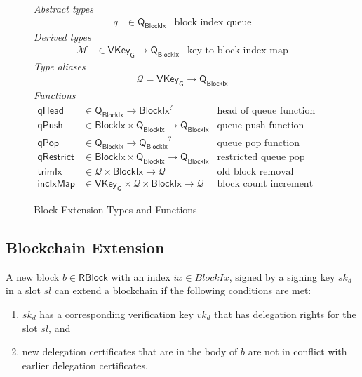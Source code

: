 \documentclass[11pt,a4paper]{article}
\newcommand{\fun}[1]{\mathsf{#1}}
\newcommand{\type}[1]{\mathsf{#1}}
\newcommand{\BlockIx}{\type{BlockIx}}
\newcommand{\RBlock}{\type{RBlock}}
\newcommand{\Queue}{\type{Q}}
\newcommand{\VKeyGen}{\type{VKey_G}}
\newcommand{\signmapname}{\mathcal{M}}
\newcommand{\trimixname}{trimIx}
\newcommand{\incixmapname}{incIxMap}
\newcommand{\qrestrname}{qRestrict}
\newcommand{\qpopname}{qPop}
\newcommand{\totalf}{\to}
\newcommand{\mapqueue}{\mathcal{Q}}
\begin{document}
\begin{figure}
  \emph{Abstract types}
  \begin{align*}
    q & \in \Queue_\BlockIx  & \text{block index queue}
  \end{align*}
  \emph{Derived types}
  \begin{align*}
    \signmapname & \in \VKeyGen \totalf \Queue_\BlockIx & \text{key to block index map}
  \end{align*}
  \emph{Type aliases}
  \begin{align*}
    \mapqueue = \VKeyGen \totalf \Queue_\BlockIx
  \end{align*}
  \emph{Functions}
  \begin{align*}
    \fun{qHead} & \in \Queue_\BlockIx \totalf \BlockIx^? & \text{head of queue function} \\
    \fun{qPush} & \in \BlockIx \times \Queue_\BlockIx \totalf \Queue_\BlockIx
      & \text{queue push function} \\
    \fun{\qpopname} & \in \Queue_\BlockIx \totalf {\Queue_\BlockIx}^?
      & \text{queue pop function} \\
    \fun{\qrestrname} & \in \BlockIx \times \Queue_\BlockIx \totalf \Queue_\BlockIx
      & \text{restricted queue pop function} \\
    \fun{\trimixname} & \in \mapqueue \times \BlockIx \totalf \mapqueue
      & \text{old block removal function} \\
    \fun{\incixmapname} & \in \VKeyGen \times \mapqueue \times \BlockIx \totalf \mapqueue
      & \text{block count increment function}
  \end{align*}
  \caption{Block Extension Types and Functions}
  \label{fig:block-ext-types-funs}
\end{figure}


\subsection{Blockchain Extension}
\label{sec:chain-extension}

A new block $b \in \RBlock$ with an index $ix \in BlockIx$, signed by a
signing key $sk_d$ in a slot $sl$ can extend a blockchain if the following
conditions are met:
%
\begin{enumerate}
\item $sk_d$ has a corresponding verification key $vk_d$ that has delegation
  rights for the slot $sl$, and
\item new delegation certificates that are in the body of $b$ are not in
  conflict with earlier delegation certificates.
\end{enumerate}
\end{document}
